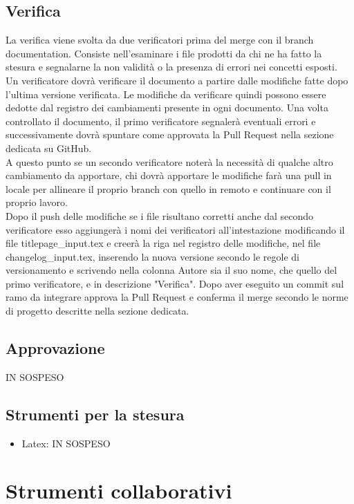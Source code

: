 \subsection{Verifica}
La verifica viene svolta da due verificatori prima del merge con il branch documentation.
Consiste nell'esaminare i file prodotti da chi ne ha fatto la stesura e segnalarne la non validità o 
la presenza di errori nei concetti esposti.\\
Un verificatore dovrà verificare il documento a partire dalle modifiche fatte dopo l'ultima versione verificata.
Le modifiche da verificare quindi possono essere dedotte dal registro dei cambiamenti presente in ogni documento.
Una volta controllato il documento, il primo verificatore segnalerà eventuali errori e
successivamente dovrà spuntare come approvata la Pull Request nella sezione dedicata su GitHub. \\
A questo punto se un secondo verificatore noterà la necessità di qualche altro cambiamento da apportare, chi dovrà apportare le modifiche farà una pull in locale per
allineare il proprio branch con quello in remoto e continuare con il proprio lavoro.\\
Dopo il push delle modifiche se i file risultano corretti anche dal secondo verificatore esso aggiungerà i nomi dei verificatori all'intestazione modificando il file titlepage\_input.tex
 e creerà la riga nel registro delle modifiche, nel file changelog\_input.tex,  inserendo la nuova versione secondo le regole di versionamento e scrivendo nella colonna Autore sia il suo nome,
che quello del primo verificatore, e in descrizione "Verifica".
Dopo aver eseguito un commit sul ramo da integrare approva la Pull Request e conferma il merge secondo le norme di progetto descritte nella sezione dedicata.

\subsection{Approvazione}
IN SOSPESO
\subsection{Strumenti per la stesura}
\begin{itemize} 
    \item Latex: IN SOSPESO
\end{itemize}

\section{Strumenti collaborativi}
